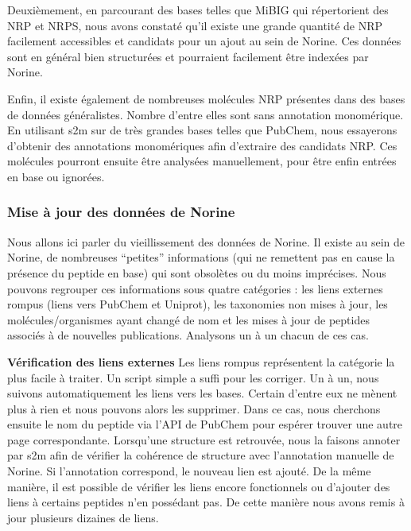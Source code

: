 Deuxièmement, en parcourant des bases telles que MiBIG qui répertorient des NRP et NRPS, nous avons constaté qu'il existe une grande quantité de NRP facilement accessibles et candidats pour un ajout au sein de Norine.
Ces données sont en général bien structurées et pourraient facilement être indexées par Norine.

Enfin, il existe également de nombreuses molécules NRP présentes dans des bases de données généralistes.
Nombre d'entre elles sont sans annotation monomérique.
En utilisant s2m sur de très grandes bases telles que PubChem, nous essayerons d'obtenir des annotations monomériques afin d'extraire des candidats NRP.
Ces molécules pourront ensuite être analysées manuellement, pour être enfin entrées en base ou ignorées.


\subsubsection{Mise à jour des données de Norine}

Nous allons ici parler du vieillissement des données de Norine.
Il existe au sein de Norine, de nombreuses ``petites'' informations (qui ne remettent pas en cause la présence du peptide en base) qui sont obsolètes ou du moins imprécises.
Nous pouvons regrouper ces informations sous quatre catégories : les liens externes rompus (liens vers PubChem et Uniprot), les taxonomies non mises à jour, les molécules/organismes ayant changé de nom et les mises à jour de peptides associés à de nouvelles publications.
Analysons un à un chacun de ces cas.


\textbf{Vérification des liens externes} 
Les liens rompus représentent la catégorie la plus facile à traiter.
Un script simple a suffi pour les corriger.
Un à un, nous suivons automatiquement les liens vers les bases.
Certain d'entre eux ne mènent plus à rien et nous pouvons alors les supprimer.
Dans ce cas, nous cherchons ensuite le nom du peptide via l'API de PubChem pour espérer trouver une autre page correspondante.
Lorsqu'une structure est retrouvée, nous la faisons annoter par s2m afin de vérifier la cohérence de structure avec l'annotation manuelle de Norine.
Si l'annotation correspond, le nouveau lien est ajouté.
De la même manière, il est possible de vérifier les liens encore fonctionnels ou d'ajouter des liens à certains peptides n'en possédant pas.
De cette manière nous avons remis à jour plusieurs dizaines de liens.


